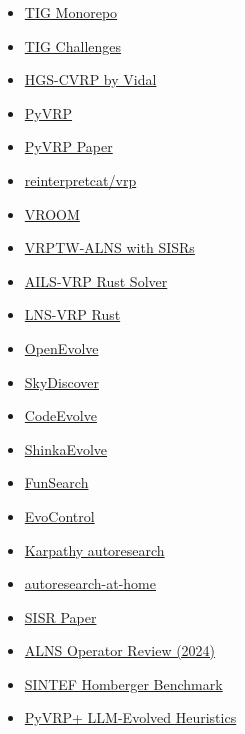 \documentclass[twocolumn,10pt,letterpaper]{article}
\begin{document}
\begin{itemize}
\setlength{\itemsep}{0pt}
\setlength{\parskip}{0pt}
  \item \href{https://github.com/tig-foundation/tig-monorepo}{TIG Monorepo}
  \item \href{https://github.com/tig-foundation/tig-challenges}{TIG Challenges}
  \item \href{https://github.com/vidalt/HGS-CVRP}{HGS-CVRP by Vidal}
  \item \href{https://github.com/PyVRP/PyVRP}{PyVRP}
  \item \href{https://arxiv.org/abs/2403.13795}{PyVRP Paper}
  \item \href{https://github.com/reinterpretcat/vrp}{reinterpretcat/vrp}
  \item \href{https://github.com/VROOM-Project/vroom}{VROOM}
  \item \href{https://github.com/TimeGone07/VRPTW-ALNS}{VRPTW-ALNS with SISRs}
  \item \href{https://github.com/dguimarans/ails-vrp-rust-solver}{AILS-VRP Rust Solver}
  \item \href{https://github.com/raviqqe/lns-vrp}{LNS-VRP Rust}
  \item \href{https://github.com/algorithmicsuperintelligence/openevolve}{OpenEvolve}
  \item \href{https://github.com/skydiscover-ai/skydiscover}{SkyDiscover}
  \item \href{https://github.com/inter-co/science-codeevolve}{CodeEvolve}
  \item \href{https://github.com/SakanaAI/ShinkaEvolve}{ShinkaEvolve}
  \item \href{https://github.com/google-deepmind/funsearch}{FunSearch}
  \item \href{https://github.com/QuantaAlpha/EvoControl}{EvoControl}
  \item \href{https://github.com/karpathy/autoresearch}{Karpathy autoresearch}
  \item \href{https://github.com/mutable-state-inc/autoresearch-at-home}{autoresearch-at-home}
  \item \href{https://pubsonline.informs.org/doi/10.1287/trsc.2019.0914}{SISR Paper}
  \item \href{https://www.sciencedirect.com/science/article/pii/S0377221724003928}{ALNS Operator Review (2024)}
  \item \href{https://www.sintef.no/projectweb/top/vrptw/homberger-benchmark/400-customers/}{SINTEF Homberger Benchmark}
  \item \href{https://arxiv.org/html/2604.07872}{PyVRP+ LLM-Evolved Heuristics}
\end{itemize}


\balance
\end{document}
